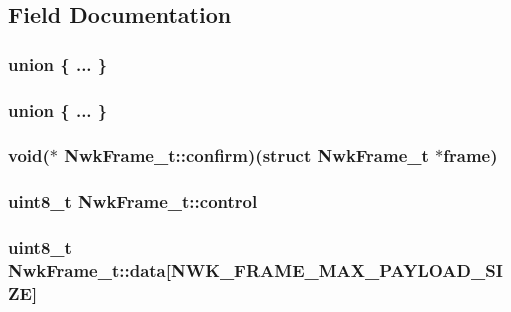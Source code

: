 \subsection{Field Documentation}
\hypertarget{struct_nwk_frame__t_a620850c2e91356398fae4bee93a792cc}{\subsubsection[{"@3}]{\setlength{\rightskip}{0pt plus 5cm}union \{ ... \} }}\label{struct_nwk_frame__t_a620850c2e91356398fae4bee93a792cc}
\hypertarget{struct_nwk_frame__t_acffc95e38f5718cde3313373af1cf6d0}{\subsubsection[{"@5}]{\setlength{\rightskip}{0pt plus 5cm}union \{ ... \} }}\label{struct_nwk_frame__t_acffc95e38f5718cde3313373af1cf6d0}
\hypertarget{struct_nwk_frame__t_a7b39f6281e35afdcbb31cbf4f959d639}{
\subsubsection[{confirm}]{\setlength{\rightskip}{0pt plus 5cm}void($\ast$ Nwk\-Frame\-\_\-t\-::confirm)(struct {\bf Nwk\-Frame\-\_\-t} $\ast$frame)}}\label{struct_nwk_frame__t_a7b39f6281e35afdcbb31cbf4f959d639}
\hypertarget{struct_nwk_frame__t_a71639d3ef8b8ced3f027c8cd5b41a780}{
\subsubsection[{control}]{\setlength{\rightskip}{0pt plus 5cm}uint8\-\_\-t Nwk\-Frame\-\_\-t\-::control}}\label{struct_nwk_frame__t_a71639d3ef8b8ced3f027c8cd5b41a780}
\hypertarget{struct_nwk_frame__t_a504e9f54f727b77a64c482fd9c54c30d}{
\subsubsection[{data}]{\setlength{\rightskip}{0pt plus 5cm}uint8\-\_\-t Nwk\-Frame\-\_\-t\-::data\mbox{[}{\bf N\-W\-K\-\_\-\-F\-R\-A\-M\-E\-\_\-\-M\-A\-X\-\_\-\-P\-A\-Y\-L\-O\-A\-D\-\_\-\-S\-I\-Z\-E}\mbox{]}}}\label{struct_nwk_frame__t_a504e9f54f727b77a64c482fd9c54c30d}



